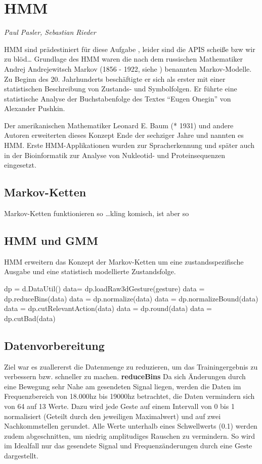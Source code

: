 ﻿\section{\acl{HMM}}
\textit{Paul Pasler, Sebastian Rieder}

\acl{HMM} sind prädestiniert für diese Aufgabe \cite{mmmFink}, leider sind die APIS scheiße bzw wir zu blöd\ldots
\cite{rabiner}
Grundlage des \acl{HMM} waren die nach dem russischen Mathematiker Andrej Andrejewitsch Markov 
(1856 - 1922, siehe \cite{wiki:markov}) benannten Markov-Modelle. Zu Beginn des 20. Jahrhunderts 
beschäftigte er sich als erster mit einer statistischen Beschreibung von Zustands- und Symbolfolgen. 
Er führte eine statistische Analyse der Buchstabenfolge des Textes ``Eugen Onegin'' von Alexander 
Pushkin.

Der amerikanischen Mathematiker Leonard E. Baum (* 1931) und andere Autoren erweiterten dieses Konzept Ende der 
sechziger Jahre und nannten es \acl{HMM}. Erste \acl{HMM}-Applikationen wurden zur Spracherkennung und später auch in der Bioinformatik 
zur Analyse von Nukleotid- und Proteinsequenzen eingesetzt. 
 
\subsection{Markov-Ketten}
Markov-Ketten funktionieren so \ldots kling komisch, ist aber so


\subsection{\acl{HMM} und \acl{GMM}}
\acl{HMM} erweitern das Konzept der Markov-Ketten um eine zustandsspezifische Ausgabe und eine statistisch 
modellierte Zustandsfolge.

    dp = d.DataUtil()
    data= dp.loadRaw3dGesture(gesture)
    data = dp.reduceBins(data)
    data = dp.normalize(data)
    data = dp.normalizeBound(data)
    data = dp.cutRelevantAction(data)
    data = dp.round(data)
    data = dp.cutBad(data)
\subsection{Datenvorbereitung}
Ziel war es zuallererst die Datenmenge zu reduzieren, um das Trainingergebnis zu verbessern bzw. schneller zu machen.
\textbf{reduceBins} Da sich Änderungen durch eine Bewegung sehr Nahe am gesendeten Signal liegen, werden die Daten im 
Frequenzbereich von 18.000hz bis 19000hz betrachtet, die Daten vermindern sich von 64 auf 13 Werte. 
Dazu wird jede Geste auf einem Intervall von 0 bis 1 normalisiert (Geteilt durch den jeweiligen Maximalwert) und 
auf zwei Nachkommstellen gerundet. 
Alle Werte unterhalb eines Schwellwerts (0.1) werden zudem abgeschnitten, um niedrig amplitudiges Rauschen zu vermindern. 
So wird im Idealfall nur das gesendete Signal und Frequenzänderungen durch eine Geste dargestellt.

